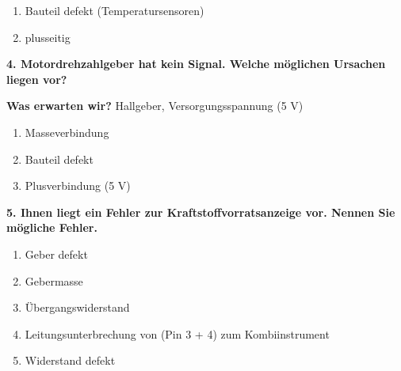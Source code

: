 \begin{enumerate}
\item
  Bauteil defekt (Temperatursensoren)
\item
  plusseitig
\end{enumerate}

\textbf{4. Motordrehzahlgeber hat kein Signal. Welche möglichen Ursachen
liegen vor?}

\textbf{Was erwarten wir?} Hallgeber, Versorgungsspannung (5 V)

\begin{enumerate}
\item
  Masseverbindung
\item
  Bauteil defekt
\item
  Plusverbindung (5 V)
\end{enumerate}

\textbf{5. Ihnen liegt ein Fehler zur Kraftstoffvorratsanzeige vor.
Nennen Sie mögliche Fehler.}

\begin{enumerate}
\item
  Geber defekt
\item
  Gebermasse
\item
  Übergangswiderstand
\item
  Leitungsunterbrechung von (Pin 3 + 4) zum Kombiinstrument
\item
  Widerstand defekt
\end{enumerate}
